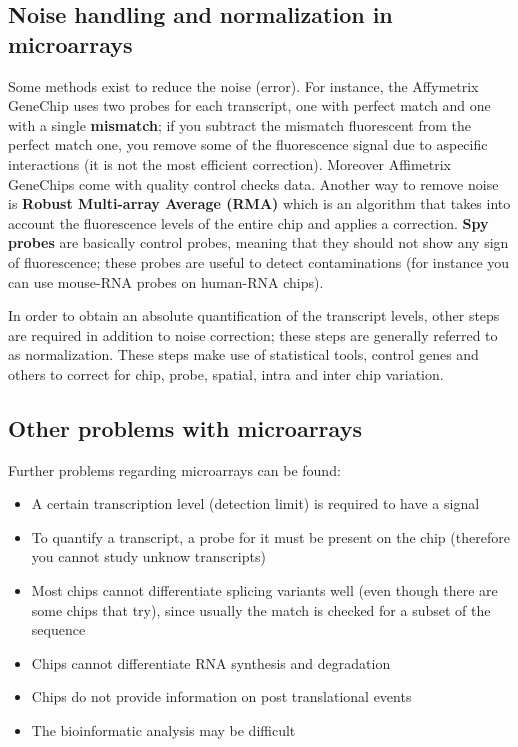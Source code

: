 	\subsection{Noise handling and normalization in microarrays}
      Some methods exist to reduce the noise (error). For instance, the Affymetrix GeneChip uses two probes for each transcript, one with perfect match and one with a single \textbf{mismatch}; if you subtract the mismatch fluorescent from the perfect match one, you remove some of the fluorescence signal due to aspecific interactions (it is not the most efficient correction). Moreover Affimetrix GeneChips come with quality control checks data. 
      Another way to remove noise is \textbf{Robust Multi-array Average (RMA)} which is an algorithm that takes into account the fluorescence levels of the entire chip and applies a correction. 
      \textbf{Spy probes} are basically control probes, meaning that they should not show any sign of fluorescence; these probes are useful to detect contaminations (for instance you can use mouse-RNA probes on human-RNA chips).

      In order to obtain an absolute quantification of the transcript levels, other steps are required in addition to noise correction; these steps are generally referred to as normalization. These steps make use of statistical tools, control genes and others to correct for chip, probe, spatial, intra and inter chip variation.

    \subsection{Other problems with microarrays}
      Further problems regarding microarrays can be found:
      \begin{itemize}
		\item A certain transcription level (detection limit) is required to have a signal
		\item To quantify a transcript, a probe for it must be present on the chip (therefore you cannot study unknow transcripts)
		\item Most chips cannot differentiate splicing variants well (even though there are some chips that try), since usually the match is checked for a subset of the sequence 
		\item Chips cannot differentiate RNA synthesis and degradation
		\item Chips do not provide information on post translational events
		\item The bioinformatic analysis may be difficult
      \end{itemize}

